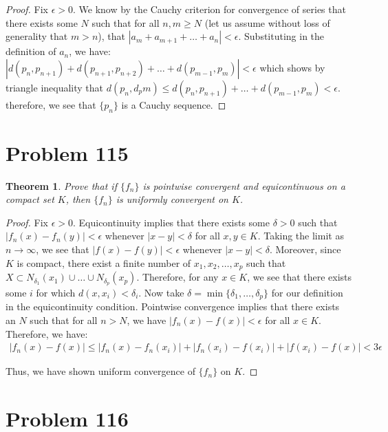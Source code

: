 \documentclass[psamsfonts]{amsart}
\newtheorem{thm}{Theorem}[section]
\theoremstyle{definition}
\theoremstyle{remark}
\numberwithin{equation}{section}
\begin{document}
\begin{proof}
Fix $\epsilon > 0$. We know by the Cauchy criterion for convergence of series that there exists some $N$ such that for all $n,m \geq N$ (let us assume without loss of generality that $m > n$), that $|a_m + a_{m+1} + \ldots + a_n | < \epsilon$. Substituting in the definition of $a_n$, we have: $| d(p_n, p_{n+1} ) + d(p_{n+1}, p_{n+2}) + \ldots + d(p_{m-1}, p_m) | < \epsilon$ which shows by triangle inequality that $d(p_n, d_pm) \leq d(p_n, p_{n+1}) + \ldots + d(p_{m-1},p_m) < \epsilon$. therefore, we see that $\{ p_n \}$ is a Cauchy sequence.
\end{proof}

\section{Problem 115}

\begin{thm}
Prove that if $\{ f_n \}$ is pointwise convergent and equicontinuous on a compact set $K$, then $\{ f_n \}$ is uniformly convergent on $K$.
\end{thm}

\begin{proof}
Fix $\epsilon > 0$.  Equicontinuity implies that there exists some $\delta > 0$ such that $|f_n(x) - f_n(y)| < \epsilon$ whenever $|x-y|< \delta$ for all $x,y \in K$. Taking the limit as $n \to \infty$, we see that $|f(x) - f(y)| < \epsilon$ whenever $|x - y | < \delta$. Moreover, since $K$ is compact, there exist a finite number of $x_1, x_2, \ldots, x_p$ such that $X \subset N_{\delta_1} (x_1) \cup \ldots \cup N_{\delta_p}(x_p) $. Therefore, for any $x \in K$, we see that there exists some $i$ for which $d(x,x_i) < \delta_i$. Now take $\delta = \min \{ \delta_1, \ldots, \delta_p \}$ for our definition in the equicontinuity condition. Pointwise convergence implies that there exists an $N$ such that for all $n > N$, we have $|f_n(x) - f(x)| < \epsilon$ for all $x \in K$. Therefore, we have:
\begin{eqnarray}
|f_n(x) - f(x)| \leq |f_n(x) - f_n(x_i)| + |f_n(x_i) - f(x_i)| + |f(x_i) - f(x) | < 3 \epsilon
\end{eqnarray}

Thus, we have shown uniform convergence of $\{ f_n \}$ on $K$. 
\end{proof}

\section{Problem 116}
\end{document}
